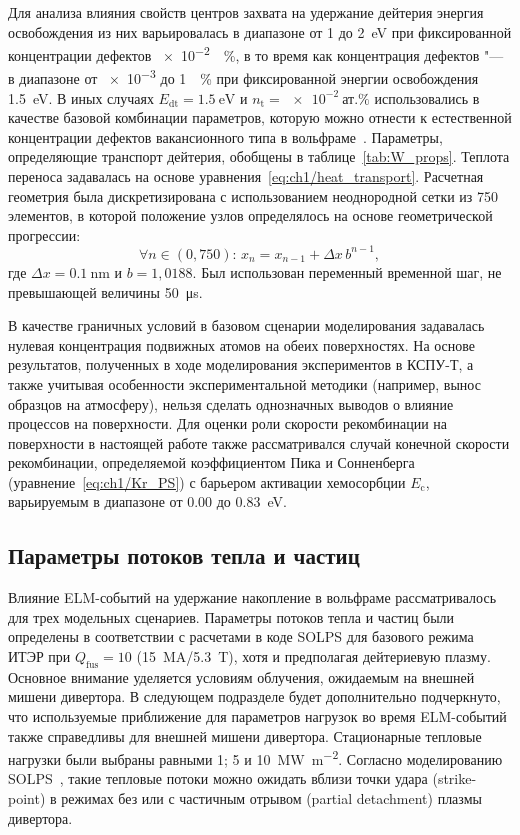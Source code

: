 Для анализа влияния свойств центров захвата на удержание дейтерия энергия освобождения из них варьировалась в диапазоне от \num{1} до \SI{2}{\electronvolt} при фиксированной концентрации дефектов \SI{e-2}{\percent}, в то время как концентрация дефектов "--- в диапазоне от \num{e-3} до \SI{1}{\percent} при фиксированной энергии освобождения \SI{1.5}{\electronvolt}. В иных случаях $E_{\mathrm{dt}}=\SI{1.5}{\electronvolt}$ и $n_{\mathrm{t}}=\SI{e-2}{\text{ат.}\percent}$ использовались в качестве базовой комбинации параметров, которую можно отнести к естественной концентрации дефектов вакансионного типа в вольфраме~\cite{DeTemmerman2018}. Параметры, определяющие транспорт дейтерия, обобщены в таблице~\cref{tab:W_props}. Теплота переноса задавалась на основе уравнения~\cref{eq:ch1/heat_transport}. Расчетная геометрия была дискретизирована с использованием неоднородной сетки из 750 элементов, в которой положение узлов определялось на основе геометрической прогрессии:
\[
	\forall n\in(0,750):\,x_{n}=x_{n-1}+\Delta x\,b^{n-1},
\]
где $\Delta x=\SI{0.1}{\nano\meter}$ и $b=1,0188$. Был использован переменный временной шаг, не превышающей величины \SI{50}{\micro\second}.

В качестве граничных условий в базовом сценарии моделирования задавалась нулевая концентрация подвижных атомов на обеих поверхностях. На основе результатов, полученных в ходе моделирования экспериментов в КСПУ-Т, а также учитывая особенности экспериментальной методики (например, вынос образцов на атмосферу), нельзя сделать однозначных выводов о влияние процессов на поверхности. Для оценки роли скорости рекомбинации на поверхности в настоящей работе также рассматривался случай конечной скорости рекомбинации, определяемой коэффициентом Пика и Сонненберга (уравнение~\cref{eq:ch1/Kr_PS}) с барьером активации хемосорбции \( E_\mathrm{c} \), варьируемым в диапазоне от \num{0.00} до \SI{0.83}{\electronvolt}.

\subsection{Параметры потоков тепла и частиц}
Влияние ELM-событий на удержание накопление в вольфраме рассматривалось для трех модельных сценариев. Параметры потоков тепла и частиц были определены в соответствии с расчетами в коде SOLPS для базового режима ИТЭР при $Q_\mathrm{fus}=\num{10}$ (\SI{15}{\mega\ampere}/\SI{5.3}{\tesla}), хотя и предполагая дейтериевую плазму. Основное внимание уделяется условиям облучения, ожидаемым на внешней мишени дивертора. В следующем подразделе будет дополнительно подчеркнуто, что используемые приближение для параметров нагрузок во время ELM-событий также справедливы для внешней мишени дивертора. Стационарные тепловые нагрузки были выбраны равными 1; 5 и \SI{10}{\mega\watt\per\meter\squared}. Согласно моделированию SOLPS~\cite{Pitts2019, Orrico2023}, такие тепловые потоки можно ожидать вблизи точки удара (strike-point) в режимах без или с частичным отрывом (partial detachment) плазмы дивертора.

